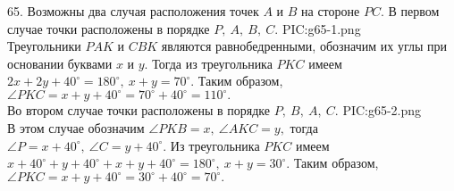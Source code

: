 65. Возможны два случая расположения точек $A$ и $B$ на стороне $PC.$ В первом случае точки расположены в порядке $P,\ A,\ B,\ C.$
{{PIC:g65-1.png}}\\
Треугольники $PAK$ и $CBK$ являются равнобедренными, обозначим их углы при основании буквами $x$ и $y.$ Тогда из треугольника $PKC$ имеем $2x+2y+40^\circ=180^\circ,\ x+y=70^\circ.$ Таким образом, $\angle PKC=x+y+40^\circ=70^\circ+40^\circ=110^\circ.$\\
Во втором случае точки расположены в порядке $P,\ B,\ A,\ C.$
{{PIC:g65-2.png}}\\
В этом случае обозначим $\angle PKB=x,\ \angle AKC=y,$ тогда $\angle P=x+40^\circ,\ \angle C=y+40^\circ.$ Из треугольника $PKC$ имеем $x+40^\circ+y+40^\circ+x+y+40^\circ=180^\circ,\ x+y=30^\circ.$ Таким образом, $\angle PKC=x+y+40^\circ=30^\circ+40^\circ=70^\circ.$\\
